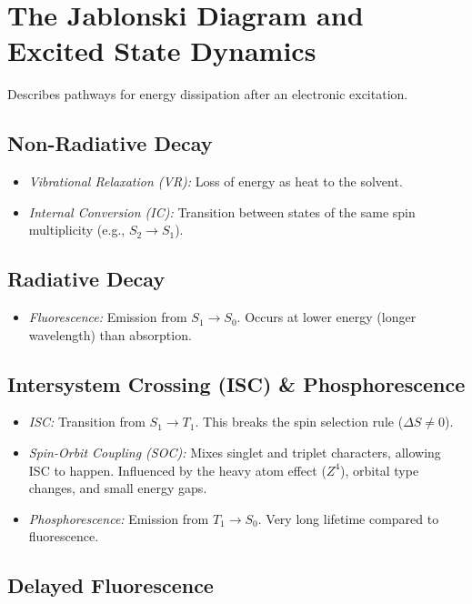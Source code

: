 \section{The Jablonski Diagram and Excited State Dynamics}
Describes pathways for energy dissipation after an electronic excitation.

\subsection{Non-Radiative Decay}

\begin{itemize}
  \item \textit{Vibrational Relaxation (VR):} Loss of energy as heat to the
  solvent.
  \item \textit{Internal Conversion (IC):} Transition between states of the
  same spin multiplicity (e.g., $S_2 \rightarrow S_1$).
\end{itemize}

\subsection{Radiative Decay}

\begin{itemize}
  \item \textit{Fluorescence:} Emission from $S_1 \rightarrow S_0$.
  Occurs at lower energy (longer wavelength) than absorption.
\end{itemize}

\subsection{Intersystem Crossing (ISC) \& Phosphorescence}

\begin{itemize}
  \item \textit{ISC:} Transition from $S_1 \rightarrow T_1$. This breaks the
  spin selection rule ($\Delta S \neq 0$).
  \item \textit{Spin-Orbit Coupling (SOC):} Mixes singlet and triplet
  characters, allowing ISC to happen. Influenced by the heavy atom effect
  ($Z^4$), orbital type changes, and small energy gaps.
  \item \textit{Phosphorescence:} Emission from $T_1 \rightarrow S_0$.
  Very long lifetime compared to fluorescence.
\end{itemize}

\subsection{Delayed Fluorescence}

